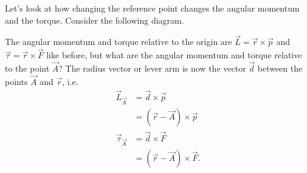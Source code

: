 \documentclass[../classical_mechanics.tex]{subfiles}
\begin{document}
        Let's look at how changing the reference point changes the angular momentum and the torque.
        Consider the following diagram.
        \begin{figure}[H]
            \centering
        \end{figure}
        The angular momentum and torque relative to the origin are $\vec{L}=\vec{r}\times\vec{p}$ and $\vec{\tau}=\vec{r}\times\vec{F}$ like before, but what are the angular momentum and torque relative to the point $\vec{A}$?
        The radius vector or lever arm is now the vector $\vec{d}$ between the points $\vec{A}$ and $\vec{r}$, i.e.
        \begin{align}
            \vec{L}_{\vec{A}}&=\vec{d}\times\vec{p}\\
            &=(\vec{r}-\vec{A})\times\vec{p}\\
            \vec{\tau}_{\vec{A}}&=\vec{d}\times\vec{F}\\
            &=(\vec{r}-\vec{A})\times\vec{F}.
        \end{align}
\end{document}
